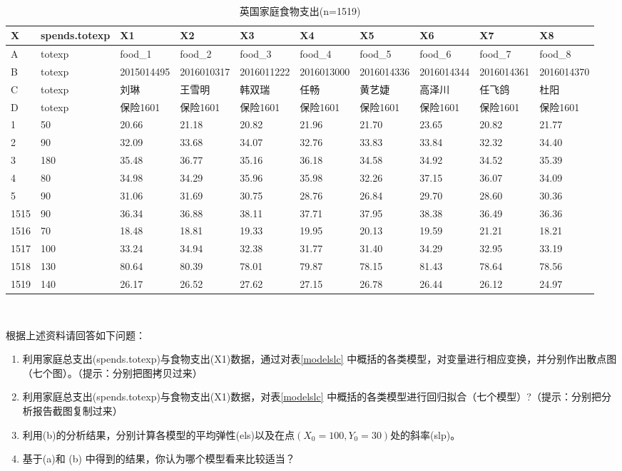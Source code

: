 \documentclass[12pt,(landscape,a4paper),(portrait,a4paper)]{article}
\newcommand{\blandscape}{\begin{landscape}}
\newcommand{\elandscape}{\end{landscape}}
\begin{document}
~

\blandscape\begin{table}

\caption{\label{tab:family-spends}英国家庭食物支出(n=1519)}
\centering
\begin{tabular}[t]{l|l|l|l|l|l|l|l|l|l}
\hline
X & spends.totexp & X1 & X2 & X3 & X4 & X5 & X6 & X7 & X8\\
\hline
A & totexp & food\_1 & food\_2 & food\_3 & food\_4 & food\_5 & food\_6 & food\_7 & food\_8\\
\hline
B & totexp & 2015014495 & 2016010317 & 2016011222 & 2016013000 & 2016014336 & 2016014344 & 2016014361 & 2016014370\\
\hline
C & totexp & 刘琳 & 王雪明 & 韩双瑞 & 任畅 & 黄艺婕 & 高泽川 & 任飞鸽 & 杜阳\\
\hline
D & totexp & 保险1601 & 保险1601 & 保险1601 & 保险1601 & 保险1601 & 保险1601 & 保险1601 & 保险1601\\
\hline
1 & 50 & 20.66 & 21.18 & 20.82 & 21.96 & 21.70 & 23.65 & 20.82 & 21.77\\
\hline
2 & 90 & 32.09 & 33.68 & 34.07 & 32.76 & 33.83 & 33.84 & 32.32 & 34.40\\
\hline
3 & 180 & 35.48 & 36.77 & 35.16 & 36.18 & 34.58 & 34.92 & 34.52 & 35.39\\
\hline
4 & 80 & 34.98 & 34.29 & 35.96 & 35.98 & 32.26 & 37.15 & 36.07 & 34.09\\
\hline
5 & 90 & 31.06 & 31.69 & 30.75 & 28.76 & 26.84 & 29.70 & 28.60 & 30.36\\
\hline
1515 & 90 & 36.34 & 36.88 & 38.11 & 37.71 & 37.95 & 38.38 & 36.49 & 36.36\\
\hline
1516 & 70 & 18.48 & 18.81 & 19.33 & 19.95 & 20.13 & 19.59 & 21.21 & 18.21\\
\hline
1517 & 100 & 33.24 & 34.94 & 32.38 & 31.77 & 31.40 & 34.29 & 32.95 & 33.19\\
\hline
1518 & 130 & 80.64 & 80.39 & 78.01 & 79.87 & 78.15 & 81.43 & 78.64 & 78.56\\
\hline
1519 & 140 & 26.17 & 26.52 & 27.62 & 27.15 & 26.78 & 26.44 & 26.12 & 24.97\\
\hline
\end{tabular}
\end{table}\elandscape  

~

根据上述资料请回答如下问题：

\begin{enumerate}
\def\labelenumi{\alph{enumi}.}
\item
  利用家庭总支出(spends.totexp)与食物支出(X1)数据，通过对表\ref{modelslc}
  中概括的各类模型，对变量进行相应变换，并分别作出散点图（七个图）。（提示：分别把图拷贝过来）
\item
  利用家庭总支出(spends.totexp)与食物支出(X1)数据，对表\ref{modelslc}
  中概括的各类模型进行回归拟合（七个模型）?（提示：分别把分析报告截图复制过来）
\item
  利用(b)的分析结果，分别计算各模型的平均弹性(els)以及在点\((X_0=100,Y_0=30)\)处的斜率(slp)。
\item
  基于(a)和 (b) 中得到的结果，你认为哪个模型看来比较适当？
\end{enumerate}
\end{document}
